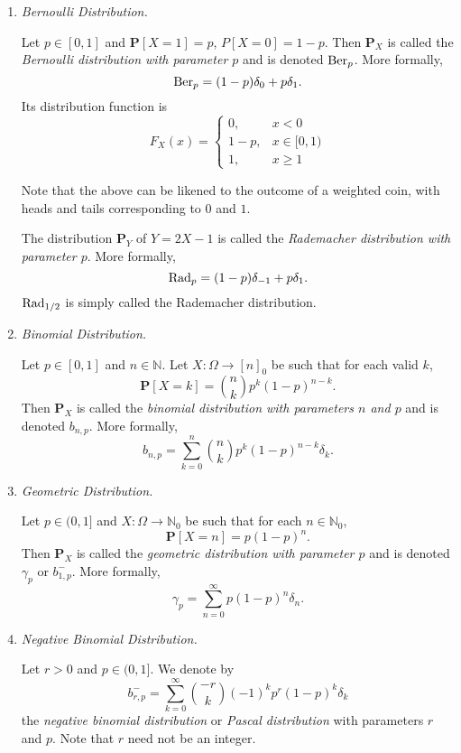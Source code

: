 \begin{enumerate}
    \item \textit{Bernoulli Distribution.}
    
    Let $p\in[0,1]$ and $\textbf{P}[X=1]=p$, $P[X=0]=1-p$. Then $\textbf{P}_X$ is called the \textit{Bernoulli distribution with parameter $p$} and is denoted $\operatorname{Ber}_p$. More formally,
    $$\operatorname{Ber}_p=(1-p)\delta_0 + p\delta_1.$$
    Its distribution function is
    $$
    F_X(x) = 
    \begin{cases}
    0, &x<0 \\
    1-p, &x\in[0,1) \\
    1, &x\geq 1
    \end{cases}
    $$
    
    Note that the above can be likened to the outcome of a weighted coin, with heads and tails corresponding to $0$ and $1$.
    
    \vspace{2mm}
    The distribution $\textbf{P}_Y$ of $Y=2X-1$ is called the \textit{Rademacher distribution with parameter $p$}. More formally,
    $$\operatorname{Rad}_p = (1-p)\delta_{-1}+p\delta_1.$$
    $\operatorname{Rad}_{1/2}$ is simply called the Rademacher distribution.
    
    \item \textit{Binomial Distribution.}
    
    Let $p\in[0,1]$ and $n\in\mathbb{N}$. Let $X:\Omega\to[n]_0$ be such that for each valid $k$,
    $$\textbf{P}[X=k]=\binom{n}{k}p^k(1-p)^{n-k}.$$
    Then $\textbf{P}_X$ is called the \textit{binomial distribution with parameters $n$ and $p$} and is denoted $b_{n,p}$. More formally,
    $$b_{n,p}=\sum_{k=0}^n \binom{n}{k}p^k(1-p)^{n-k}\delta_k.$$
    
    \item \textit{Geometric Distribution.}
    
    Let $p\in(0,1]$ and $X:\Omega\to\mathbb{N}_0$ be such that for each $n\in\mathbb{N}_0$,
    $$\textbf{P}[X=n]=p(1-p)^n.$$
    Then $\textbf{P}_X$ is called the \textit{geometric distribution with parameter $p$} and is denoted $\gamma_p$ or $b_{1,p}^{-}$. More formally,
    $$\gamma_p=\sum_{n=0}^\infty p(1-p)^n\delta_n.$$
    
    \item \textit{Negative Binomial Distribution.}
    
    Let $r>0$ and $p\in(0,1]$. We denote by
    $$b^{-}_{r,p}=\sum_{k=0}^\infty \binom{-r}{k}(-1)^kp^r(1-p)^k\delta_k$$
    the \textit{negative binomial distribution} or \textit{Pascal distribution} with parameters $r$ and $p$. Note that $r$ need not be an integer.
    

\end{enumerate}
